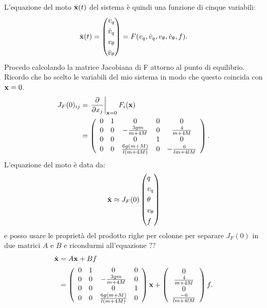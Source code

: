 L'equazione del moto $\dot {\mathbf{x}}(t)$ del sistema è quindi una funzione di cinque variabili:
\begin{equation*}
     \dot {\mathbf{x}}(t) = \left(
        \begin{aligned}
            v_q \\
            \dot v_q \\
            v_\theta \\
            \dot v_\theta
        \end{aligned}
    \right) = F(v_q, \dot v_q, v_\theta, \dot v_\theta, f).
\end{equation*}
Procedo calcolando la matrice Jacobiana di F attorno al punto di equilibrio. Ricordo che ho scelto le variabili del mio sistema in modo che questo coincida con $\mathbf{x} = 0$.
\begin{equation*}
\begin{aligned}
    J_F(0)_{ij} &= \left. \frac \partial {\partial x_j} \right|_{\mathbf{x} = 0} F_i(\mathbf{x}) \\
   &= \left(\begin{array}{ccccc}0&1&0&0&0\\0&0&-\frac{3gm}{m+4M}&0&\frac{4}{m+4M}\\0&0&0&1&0\\0&0&\frac{6g(m+M)}{l(m+4M)}&0&-\frac{6}{lm+4lM}\\\end{array}\right) .
\end{aligned}
\end{equation*}
L'equazione del moto è data da:
\begin{equation*}
    \dot {\mathbf{x}} \approx J_F(0) \left( \begin{aligned}
        &q \\
         &v_q \\
        &\theta \\
        &v_\theta \\
        &f
    \end{aligned}  \right)
\end{equation*}
e posso usare le proprietà del prodotto righe per colonne per separare $J_F(0)$ in due matrici $A$ e $B$ e ricondurmi all'equazione ?? 
\begin{equation*}
\begin{aligned}
    \dot {\mathbf{x}} &= A\mathbf{x} + Bf \\
    &= \left(\begin{array}{cccc}0&1&0&0\\0&0&-\frac{3gm}{m+4M}&0\\0&0&0&1\\0&0&\frac{6g(m+M)}{l(m+4M)}&0\\\end{array}\right) \mathbf{x} + \left(\begin{array}{c}0\\\frac{4}{m+4M}\\0\\\frac{-6}{lm+4lM}\end{array}\right)f.
\end{aligned}
\end{equation*}

